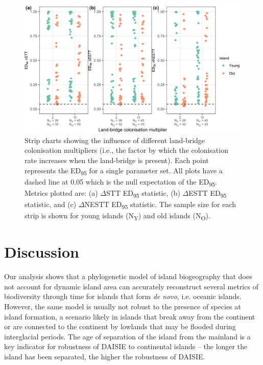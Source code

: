 \documentclass{article}
\begin{document}
\begin{figure}
    \centering
    \includegraphics[width=\textwidth]{nonoceanic_lb_immigration multiplier_spec_nltt.png}
    \caption{Strip charts showing the influence of different land-bridge colonisation multipliers (i.e., the factor by which the colonisation rate increases when the land-bridge is present). Each point represents the ED\textsubscript{95} for a single parameter set. All plots have a dashed line at 0.05 which is the null expectation of the ED\textsubscript{95}. Metrics plotted are: (a) $\Delta$STT ED\textsubscript{95} statistic, (b) $\Delta$ESTT ED\textsubscript{95} statistic, and (c) $\Delta$NESTT ED\textsubscript{95} statistic. The sample size for each strip is shown for young islands (N\textsubscript{Y}) and old islands (N\textsubscript{O}).}
    \label{fig:nonoceanic_lb_immigration multiplier_spec_nltt}
\end{figure}

\clearpage

\section*{Discussion}

Our analysis shows that a phylogenetic model of island biogeography that does not account for dynamic island area can accurately reconstruct several metrics of biodiversity through time for islands that form \textit{de novo}, i.e. oceanic islands. However, the same model is usually not robust to the presence of species at island formation, a scenario likely in islands that break away from the continent or are connected to the continent by lowlands that may be flooded during interglacial periods. The age of separation of the island from the mainland is a key indicator for robustness of DAISIE to continental islands – the longer the island has been separated, the higher the robustness of DAISIE. \\
\end{document}
